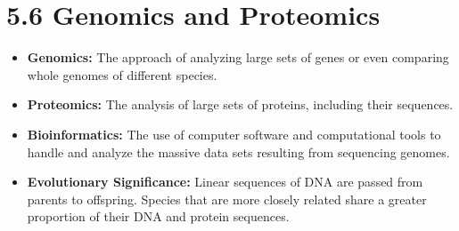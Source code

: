 \documentclass[11pt, a4paper]{article}
\begin{document}
\section*{5.6 Genomics and Proteomics}
\begin{itemize}
    \item \textbf{Genomics:} The approach of analyzing large sets of genes or even comparing whole genomes of different species.
    \item \textbf{Proteomics:} The analysis of large sets of proteins, including their sequences.
    \item \textbf{Bioinformatics:} The use of computer software and computational tools to handle and analyze the massive data sets resulting from sequencing genomes.
    \item \textbf{Evolutionary Significance:} Linear sequences of DNA are passed from parents to offspring. Species that are more closely related share a greater proportion of their DNA and protein sequences.
\end{itemize}
\end{document}
